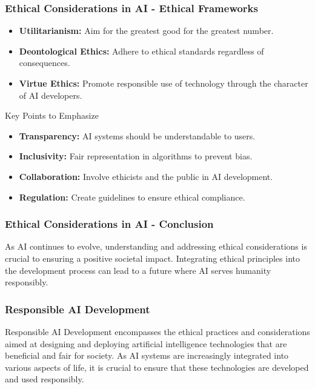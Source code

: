 \documentclass[aspectratio=169]{beamer}
\begin{document}
\begin{frame}[fragile]
    \frametitle{Ethical Considerations in AI - Ethical Frameworks}
    \begin{itemize}
        \item \textbf{Utilitarianism:} Aim for the greatest good for the greatest number.
        \item \textbf{Deontological Ethics:} Adhere to ethical standards regardless of consequences.
        \item \textbf{Virtue Ethics:} Promote responsible use of technology through the character of AI developers.
    \end{itemize}

    \begin{block}{Key Points to Emphasize}
        \begin{itemize}
            \item \textbf{Transparency:} AI systems should be understandable to users.
            \item \textbf{Inclusivity:} Fair representation in algorithms to prevent bias.
            \item \textbf{Collaboration:} Involve ethicists and the public in AI development.
            \item \textbf{Regulation:} Create guidelines to ensure ethical compliance.
        \end{itemize}
    \end{block}
\end{frame}

\begin{frame}[fragile]
    \frametitle{Ethical Considerations in AI - Conclusion}
    As AI continues to evolve, understanding and addressing ethical considerations is crucial to ensuring a positive societal impact. 
    Integrating ethical principles into the development process can lead to a future where AI serves humanity responsibly.
\end{frame}

\begin{frame}[fragile]
    \frametitle{Responsible AI Development}
    
    Responsible AI Development encompasses the ethical practices and considerations aimed at designing and deploying artificial intelligence technologies that are beneficial and fair for society. As AI systems are increasingly integrated into various aspects of life, it is crucial to ensure that these technologies are developed and used responsibly.
\end{frame}
\end{document}
